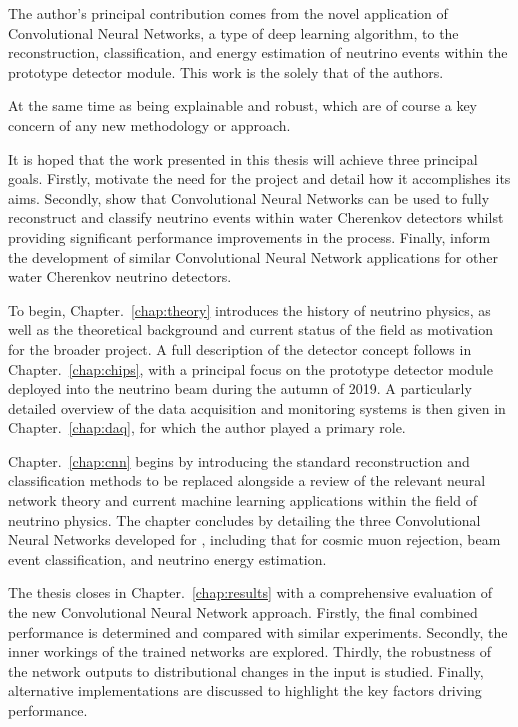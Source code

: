 The author's principal contribution comes from the novel application of Convolutional Neural
Networks, a type of deep learning algorithm, to the reconstruction, classification, and energy
estimation of neutrino events within the \chipsfive prototype detector module. This work is the
solely that of the authors. 

At the same time as being explainable and robust, which are of course a key concern of
any new methodology or approach. 

It is hoped that the work presented in this thesis will achieve three principal goals. Firstly,
motivate the need for the \chips project and detail how it accomplishes its aims. Secondly, show
that Convolutional Neural Networks can be used to fully reconstruct and classify neutrino events
within water Cherenkov detectors whilst providing significant performance improvements in the
process. Finally, inform the development of similar Convolutional Neural Network applications for
other water Cherenkov neutrino detectors.

To begin, Chapter.~\ref{chap:theory} introduces the history of neutrino physics, as well as the
theoretical background and current status of the field as motivation for the broader \chips
project. A full description of the \chips detector concept follows in Chapter.~\ref{chap:chips},
with a principal focus on the \chipsfive prototype detector module deployed into the \numi
neutrino beam during the autumn of 2019. A particularly detailed overview of the \chipsfive data
acquisition and monitoring systems is then given in Chapter.~\ref{chap:daq}, for which the author
played a primary role.

Chapter.~\ref{chap:cnn} begins by introducing the standard reconstruction and classification
methods to be replaced alongside a review of the relevant neural network theory and current
machine learning applications within the field of neutrino physics. The chapter concludes by
detailing the three Convolutional Neural Networks developed for \chipsfive, including that for
cosmic muon rejection, beam event classification, and neutrino energy estimation.

The thesis closes in Chapter.~\ref{chap:results} with a comprehensive evaluation of the new
Convolutional Neural Network approach. Firstly, the final combined performance is determined and
compared with similar experiments. Secondly, the inner workings of the trained networks are
explored. Thirdly, the robustness of the network outputs to distributional changes in the input is
studied. Finally, alternative implementations are discussed to highlight the key factors driving
performance.